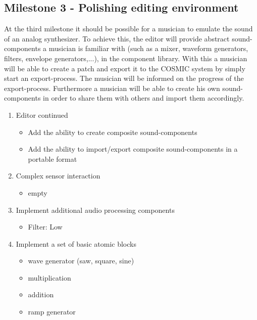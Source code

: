 \subsection{Milestone 3 - Polishing editing environment}

At the third milestone it should be possible for a musician to emulate the sound of an analog synthesizer. To achieve this, the editor will provide abstract sound-components a musician is familiar with (such as a mixer, waveform generators, filters, envelope generators,...), in the component library. With this a  musician will be able to create a patch and export it to the COSMIC system by simply start an export-process. The musician will be informed on the progress of the export-process. Furthermore a musician will be able to create his own sound-components in order to share them with others and import them accordingly.

	\begin{enumerate}
		\item Editor continued
			\begin{itemize}
				\item Add the ability to create composite sound-components
				\item Add the ability to import/export composite sound-components in a portable format
			\end{itemize}
		\item Complex sensor interaction
			\begin{itemize}
			\item empty
			\end{itemize}
		\item Implement additional audio processing components	
			\begin{itemize}
				\item Filter: Low
			\end{itemize}
		\item Implement a set of basic atomic blocks
			\begin{itemize}
				\item wave generator (saw, square, sine)
				\item multiplication
				\item addition
				\item ramp generator
			\end{itemize}
	\end{enumerate}
	
